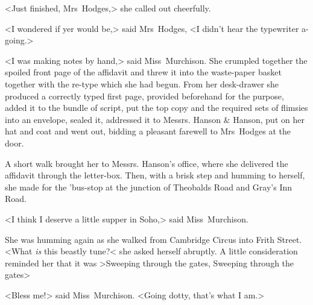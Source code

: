 <Just finished, Mrs~Hodges,> she called out cheerfully.

<I wondered if yer would be,> said Mrs~Hodges, <I didn't hear the typewriter a-going.>

<I was making notes by hand,> said Miss~Murchison. She crumpled together the spoiled front page of the affidavit and threw it into the waste-paper basket together with the re-type which she had begun. From her desk-drawer she produced a correctly typed first page, provided beforehand for the purpose, added it to the bundle of script, put the top copy and the required sets of flimsies into an envelope, sealed it, addressed it to Messrs. Hanson \& Hanson, put on her hat and coat and went out, bidding a pleasant farewell to Mrs~Hodges at the door.

A short walk brought her to Messrs. Hanson's office, where she delivered the affidavit through the letter-box. Then, with a brisk step and humming to herself, she made for the 'bus-stop at the junction of Theobalds Road and Gray's Inn Road.

<I think I deserve a little supper in Soho,> said Miss~Murchison.

She was humming again as she walked from Cambridge Circus into Frith Street. <What \emph{is} this beastly tune?< she asked herself abruptly. A little consideration reminded her that it was >Sweeping through the gates, Sweeping through the gates\longdots>

<Bless me!> said Miss~Murchison. <Going dotty, that's what I am.>